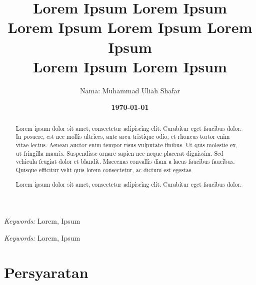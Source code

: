 \documentclass[11pt]{simart} %
\title{
\textbf{Lorem Ipsum Lorem Ipsum \\
Lorem Ipsum Lorem Ipsum Lorem Ipsum} \\
\textbf{{Lorem Ipsum Lorem Ipsum \\}}
} %
\date{\textbf{\today}}
\author{
\begin{tabular}{@{}ll@{}}
	Nama & : Muhammad Uliah Shafar\\
\end{tabular}
}
\begin{document}


\maketitle %

\begin{abstract}
	Lorem ipsum dolor sit amet, consectetur adipiscing elit. Curabitur eget faucibus dolor. In posuere, est nec mollis ultrices, ante arcu tristique odio, et rhoncus tortor enim vitae lectus. Aenean auctor enim tempor risus vulputate finibus. Ut quis molestie ex, ut fringilla mauris. Suspendisse ornare sapien nec neque placerat dignissim. Sed vehicula feugiat dolor et blandit. Maecenas convallis diam a lacus faucibus faucibus. Quisque efficitur velit quis lorem consectetur, ac dictum est egestas.

\end{abstract}

\hspace*{3.6mm}\textit{Keywords:} Lorem, Ipsum %


\begin{otherlanguage}{english}
	\begin{abstract}
		Lorem ipsum dolor sit amet, consectetur adipiscing elit. Curabitur eget faucibus dolor.
	\end{abstract}
\end{otherlanguage}

\hspace*{3.6mm}\textit{Keywords:} Lorem, Ipsum %

\vspace{30pt} %

% 

\section{Persyaratan}%
\label{sec:Persyaratan}
\end{document}
